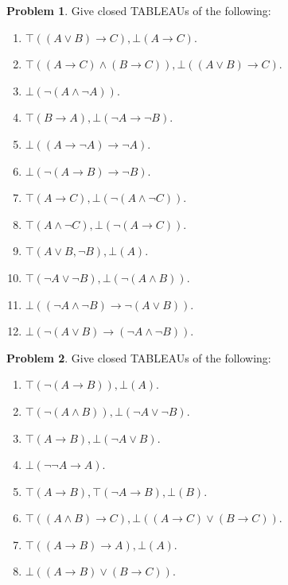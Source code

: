 \documentclass[10pt,a4paper]{article}
\newcommand*{\olup}[1]{\MakeUppercase{#1}}
\theoremstyle{plain}
\theoremstyle{definition}
\newtheorem{prob}{Problem}[section]
\theoremstyle{remark}
\providecommand{\lif}{\mathbin{\rightarrow}}
\providecommand{\sFmla}[2]{#1(#2)}
\providecommand{\True}{\top}
\providecommand{\False}{\bot}
\begin{document}
\begin{prob}
Give closed \olup{tableau}s of the following:
\begin{enumerate}
\item $\sFmla{\True}{(A \lor B) \lif C}, \sFmla{\False}{A \lif C}$.
\item $\sFmla{\True}{(A \lif C) \land (B \lif C)}, \sFmla{\False}{(A \lor B) \lif C}$.
\item $\sFmla{\False}{\lnot(A \land \lnot A)}$.
\item $\sFmla{\True}{B \lif A}, \sFmla{\False}{\lnot A \lif \lnot B}$.
\item $\sFmla{\False}{(A \lif \lnot A) \lif \lnot A}$.
\item $\sFmla{\False}{\lnot(A \lif B) \lif \lnot B}$.
\item $\sFmla{\True}{A \lif C}, \sFmla{\False}{\lnot (A \land \lnot C)}$.
\item $\sFmla{\True}{A \land \lnot C}, \sFmla{\False}{\lnot (A \lif C)}$.
\item $\sFmla{\True}{A \lor B, \lnot B}, \sFmla{\False}{A}$.
\item $\sFmla{\True}{\lnot A \lor \lnot B}, \sFmla{\False}{\lnot(A \land B)}$.
\item $\sFmla{\False}{(\lnot A \land \lnot B) \lif\lnot(A \lor B)}$.
\item $\sFmla{\False}{\lnot(A \lor B) \lif (\lnot A \land \lnot B)}$.
\end{enumerate}
\end{prob}

\begin{prob}
Give closed \olup{tableau}s of the following:
\begin{enumerate}
\item $\sFmla{\True}{\lnot(A \lif B)}, \sFmla{\False}{A}$.
\item $\sFmla{\True}{\lnot(A \land B)}, \sFmla{\False}{\lnot A \lor \lnot B}$.
\item $\sFmla{\True}{A \lif B}, \sFmla{\False}{\lnot A \lor B}$.
\item $\sFmla{\False}{\lnot \lnot A \lif A}$.
\item $\sFmla{\True}{A \lif B}, \sFmla{\True}{\lnot A \lif B}, \sFmla{\False}{B}$.
\item $\sFmla{\True}{(A \land B) \lif C}, \sFmla{\False}{(A \lif C) \lor (B \lif C)}$.
\item $\sFmla{\True}{(A \lif B) \lif A}, \sFmla{\False}{A}$.
\item $\sFmla{\False}{(A \lif B) \lor (B \lif C)}$.
\end{enumerate}
\end{prob}
\end{document}
